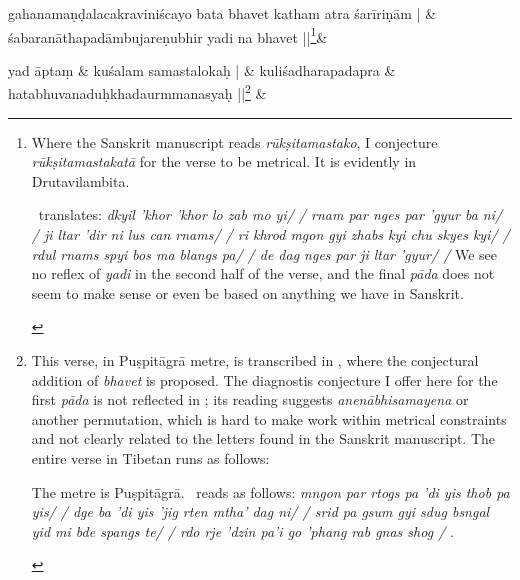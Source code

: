 \documentclass[naipra.tex]{subfiles}
\begin{document}
\begin{sanskrit}
\medskip\versequote
gahanamaṇḍalacakraviniścayo bata bhavet katham atra śarīriṇām | &
śabaranāthapadāmbujareṇubhir yadi na  bhavet ||\footnote{
	\begin{english}%
		Where the Sanskrit manuscript reads \emph{rūkṣitamastako}, I conjecture \emph{rūkṣitamastakatā} for the verse to be metrical.
		It is evidently in Drutavilambita.

		\TIB\ translates: \emph{%
			dkyil 'khor 'khor lo zab mo yi/ /
			rnam par nges par 'gyur ba ni/ /
			ji ltar 'dir ni lus can rnams/ /
			ri khrod mgon gyi zhabs kyi chu skyes kyi/ /
			rdul rnams spyi bos ma blangs pa/ /
			de dag nges par ji ltar 'gyur/ /%
		} We see no reflex of \emph{yadi} in the second half of the verse, and the final \emph{pāda} does not seem to make sense or even be based on anything we have in Sanskrit.
	\end{english}
}\&

% 
%   


\medskip\versequote
{} yad āptaṃ &
\hspace{20pt} kuśalam  samastalokaḥ | \&
\versequote
kuliśadharapadapra &
\hspace{20pt} hatabhuvanaduḥkhadaurmmanasyaḥ ||\footnote{
	This verse, in Puṣpitāgrā metre, is transcribed in \cite[128]{isaacson2009}, where the conjectural addition of \emph{bhavet} is proposed.
	The diagnostis conjecture I offer here for the first \emph{pāda} is not reflected in \TIB ; its reading suggests \emph{anenābhisamayena} or another permutation, which is hard to make work within metrical constraints and not clearly related to the letters found in the Sanskrit manuscript.
	The entire verse in Tibetan runs as follows:
	\begin{english}%
		The metre is Puṣpitāgrā.
		\TIB\ reads as follows: \emph{%
			mngon par rtogs pa 'di yis thob pa yis/ /
			dge ba 'di yis 'jig rten mtha' dag ni/ /
			srid pa gsum gyi sdug bsngal yid mi bde spangs te/ / 
			rdo rje 'dzin pa'i go 'phang rab gnas shog /
		}.
	\end{english}
} \&


\end{sanskrit}
\end{document}
